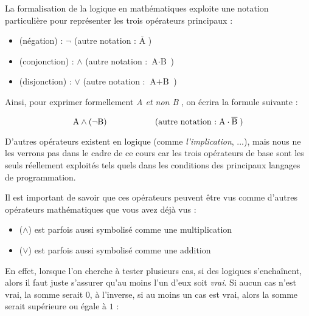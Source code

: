 \documentclass[11pt,a4paper]{article}
\begin{document}

La formalisation de la logique en mathématiques exploite une notation particulière pour représenter les trois opérateurs principaux :

\begin{itemize}
\item {} (négation) : $ \neg $      \hspace*{2cm}  (autre notation : $ \overline{\text{A}} $ )
\item {} (conjonction) : $ \wedge $  \hspace*{2cm}  (autre notation : $ \text{A} \cdot \text{B} $ )
\item {} (disjonction) : $ \vee $    \hspace*{2cm}  (autre notation : $ \text{A} + \text{B} $ )
\end{itemize}

Ainsi, pour exprimer formellement \og \textit{A et non B} \fg{}, on écrira la formule suivante :

\begin{equation*}
\text{A} \wedge ( \neg \text{B} )    \hspace*{2cm}    \text{(autre notation :} \;   \text{A} \cdot \overline{\text{B}}   \; \text{)}
\end{equation*}

D'autres opérateurs existent en logique (comme \textit{l'implication}, ...), mais nous ne les verrons pas dans le cadre de ce cours car les trois opérateurs de base sont les seuls réellement exploités tels quels dans les conditions des principaux langages de programmation.

\medskip

Il est important de savoir que ces opérateurs peuvent être vus comme d'autres opérateurs mathématiques que vous avez déjà vus :

\begin{itemize}
\item {} ($ \wedge $) est parfois aussi symbolisé comme une multiplication
\item {} ($ \vee $) est parfois aussi symbolisé comme une addition
\end{itemize}

En effet, lorsque l'on cherche à tester plusieurs cas, si des  logiques s'enchaînent, alors il faut juste s'assurer qu'au moins l'un d'eux soit \textit{vrai}.
Si aucun cas n'est vrai, la somme serait $ 0 $, à l'inverse, si au moins un cas est vrai, alors la somme serait supérieure ou égale à $ 1 $ :
\end{document}
